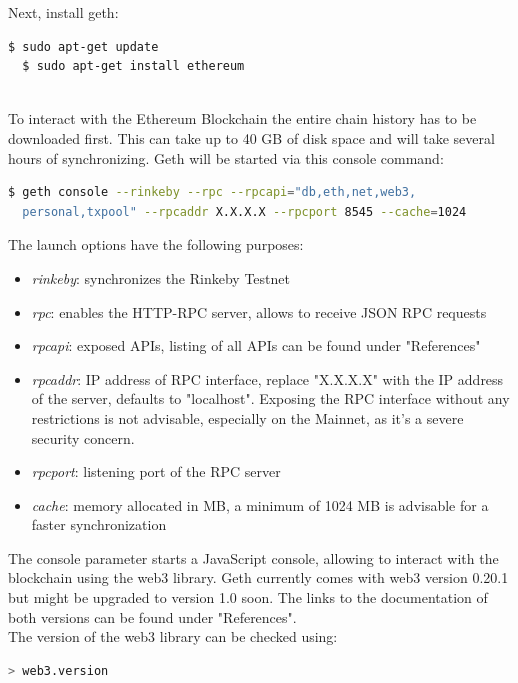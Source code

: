 Next, install geth:
\begin{lstlisting}[language=bash]
  $ sudo apt-get update
  $ sudo apt-get install ethereum
\end{lstlisting}
\leavevmode
\\
To interact with the Ethereum Blockchain the entire chain history has to be downloaded first. This can take up to 40 GB of disk space and will take several hours of synchronizing. Geth will be started via this console command:
\begin{lstlisting}[language=bash, showstringspaces=false]
  $ geth console --rinkeby --rpc --rpcapi="db,eth,net,web3,
  personal,txpool" --rpcaddr X.X.X.X --rpcport 8545 --cache=1024
\end{lstlisting}

The launch options have the following purposes\cite{cli-options}:
\begin{itemize}
    \item \textit{rinkeby}: synchronizes the Rinkeby Testnet
    \item \textit{rpc}: enables the HTTP-RPC server, allows to receive JSON RPC requests
    \item \textit{rpcapi}: exposed APIs, listing of all APIs can be found under "References"\cite{json-rpc}\cite{management-apis}
    \item \textit{rpcaddr}: IP address of RPC interface, replace "X.X.X.X" with the IP address of the server, defaults to "localhost". Exposing the RPC interface without any restrictions is not advisable, especially on the Mainnet, as it's a severe security concern.
    \item \textit{rpcport}: listening port of the RPC server
    \item \textit{cache}: memory allocated in MB, a minimum of 1024 MB is advisable for a faster synchronization
\end{itemize}
The console parameter starts a JavaScript console, allowing to interact with the blockchain using the web3 library. Geth currently comes with web3 version 0.20.1\cite{javascript-0.20} but might be upgraded to version 1.0\cite{javascript-1.0} soon. The links to the documentation of both versions can be found under "References".
\\
The version of the web3 library can be checked using:

\begin{lstlisting}[language=bash]
  > web3.version
\end{lstlisting}

